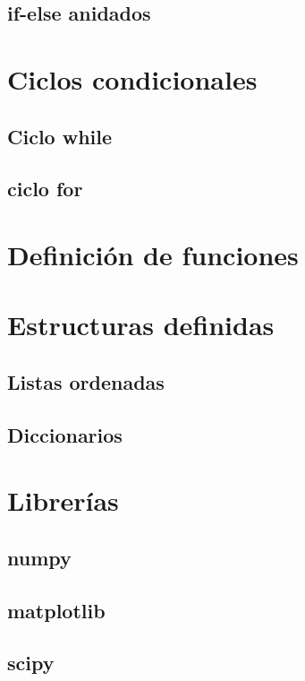 \documentclass[a4paper, openright, 12pt]{article}
\begin{document}
    \subsection{if-else anidados}

    \newpage{}


  \section{Ciclos condicionales}
    \subsection{Ciclo while}
    \subsection{ciclo for}

    \newpage{}

  \section{Definición de funciones}

    \newpage{}


  \section{Estructuras definidas}
    \subsection{Listas ordenadas}
    \subsection{Diccionarios}

    \newpage{}


  \section{Librerías}
    \subsection{numpy}
    \subsection{matplotlib}
    \subsection{scipy}
\end{document}
